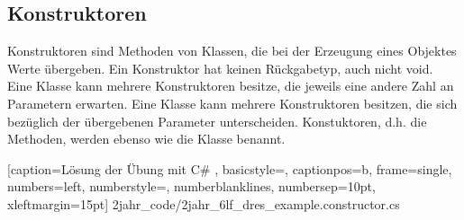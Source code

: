 \subsection{Konstruktoren}

Konstruktoren sind Methoden von Klassen, die bei der Erzeugung eines Objektes Werte übergeben. Ein Konstruktor hat keinen Rückgabetyp, auch nicht void. Eine Klasse kann mehrere Konstruktoren besitze, die jeweils eine andere Zahl an Parametern erwarten. Eine Klasse kann mehrere Konstruktoren besitzen, die sich bezüglich der übergebenen Parameter unterscheiden. Konstuktoren, d.h. die Methoden, werden ebenso wie die Klasse benannt.


	[caption={Lösung der Übung mit C\#}
	\label{lst:6lf_dres_example.constructor.cs},
	basicstyle=\small,
	captionpos=b,
	frame=single,
	numbers=left,
	numberstyle=\small,
	numberblanklines,
	numbersep=10pt,
	xleftmargin=15pt]
	{2jahr_code/2jahr_6lf_dres_example.constructor.cs}
